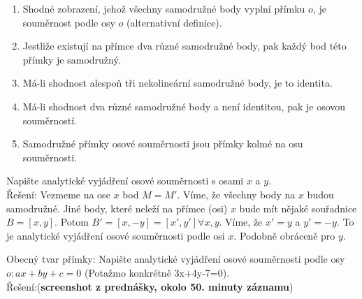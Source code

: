 \documentclass[../main.tex]{subfiles}
\begin{document}
\begin{remark}

    \begin{enumerate}
        \item Shodné zobrazení, jehož všechny samodružné body vyplní přímku $o$, je souměrnost
        podle osy $o$ (alternativní definice).
        \item Jestliže existují na přímce dva různé samodružné body, pak každý bod této přímky
        je samodružný.
        \item Má-li shodnost alespoň tři nekolineární samodružné body, je to identita.
        \item Má-li shodnost dva různé samodružné body a není identitou, pak je osovou souměrností.
        \item Samodružné přímky osové souměrnosti jsou přímky kolmé na osu souměrnosti.
    \end{enumerate}
\end{remark}

\begin{example}
    Napište analytické vyjádření osové souměrnosti s osami $x$ a $y$.\\
    Řešení: Vezmeme na ose $x$ bod $M=M'$. Víme, že všechny body na $x$ budou samodružné.
    Jiné body, které neleží na přímce (osi) $x$ bude mít nějaké souřadnice $B = [x,y]$.
    Potom $B' = [x,-y] = [x',y'] \forall x,y$. Víme, že $x' = y$ a $y' = -y$. To je analytické vyjádření
    osové souměrnosti podle osi $x$. Podobně obráceně pro $y$. 
\end{example}

\begin{example}
    Obecný tvar přímky: Napište analytické vyjádření osové souměrnosti podle osy \\
    $o:ax+by+c=0$ (Potažmo konkrétně 3x+4y-7=0).\\
    Řešení:(\textbf{screenshot z prednášky, okolo 50. minuty záznamu})
\end{example}
\end{document}
